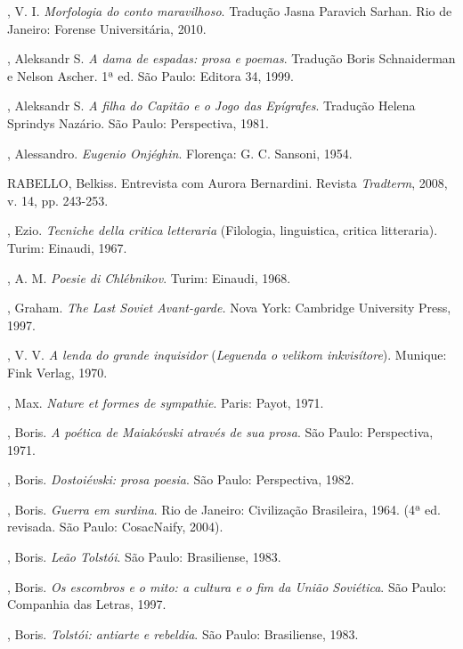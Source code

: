 \begin{Parskip}
{, V. I. \emph{Morfologia do conto maravilhoso}. Tradução Jasna Paravich Sarhan. Rio de Janeiro: Forense Universitária, 2010.

, Aleksandr S. \emph{A dama de espadas: prosa e poemas}. Tradução Boris Schnaiderman e Nelson Ascher. 1ª ed. São Paulo: Editora 34, 1999.

, Aleksandr S. \emph{A filha do Capitão e o Jogo das Epígrafes}. Tradução Helena Sprindys Nazário. São Paulo: Perspectiva, 1981.

, Alessandro. \emph{Eugenio Onjéghin}. Florença: G. C. Sansoni, 1954.

\scalebox{0.8}RABELLO, Belkiss. Entrevista com Aurora Bernardini. Revista \emph{Tradterm}, 2008, v. 14, pp. 243-253.

, Ezio. \emph{Tecniche della critica letteraria} (Filologia, linguistica, critica litteraria). Turim: Einaudi, 1967.

, A. M. \emph{Poesie di Chlébnikov}. Turim: Einaudi, 1968.

, Graham. \emph{The Last Soviet Avant-garde.} Nova York:
Cambridge University Press, 1997.

, V. V. \emph{A lenda do grande inquisidor} (\emph{Leguenda o velikom inkvisítore}). Munique: Fink
Verlag, 1970.

, Max. \emph{Nature et formes de sympathie}. Paris:
Payot, 1971.

, Boris. \emph{A poética de Maiakóvski através de sua prosa}. São Paulo: Perspectiva, 1971.

, Boris. \emph{Dostoiévski: prosa poesia}. São Paulo: Perspectiva, 1982.

, Boris. \emph{Guerra em surdina}. Rio de Janeiro: Civilização Brasileira, 1964. (4ª ed.
  revisada. São Paulo: CosacNaify, 2004).

, Boris. \emph{Leão Tolstói}. São Paulo: Brasiliense, 1983.

, Boris. \emph{Os escombros e o mito: a cultura e o fim da União Soviética}. São Paulo: Companhia das Letras, 1997.

, Boris. \emph{Tolstói: antiarte e rebeldia}. São Paulo: Brasiliense, 1983.

}
\end{Parskip}
